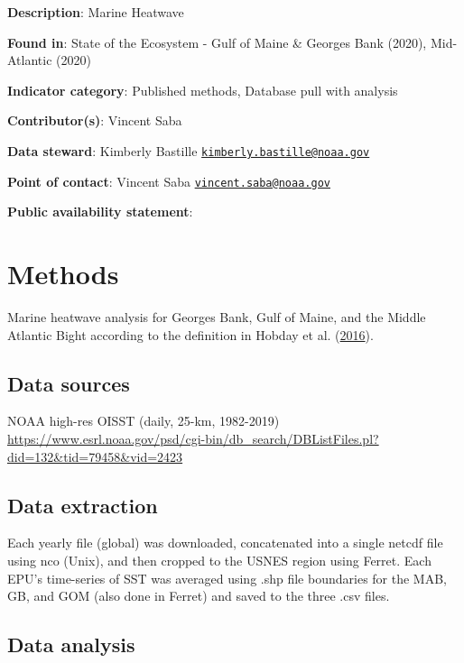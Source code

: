 \documentclass[
]{book}
\begin{document}
\textbf{Description}: Marine Heatwave

\textbf{Found in}: State of the Ecosystem - Gulf of Maine \& Georges Bank (2020), Mid-Atlantic (2020)

\textbf{Indicator category}: Published methods, Database pull with analysis

\textbf{Contributor(s)}: Vincent Saba

\textbf{Data steward}: Kimberly Bastille \href{mailto:kimberly.bastille@noaa.gov}{\nolinkurl{kimberly.bastille@noaa.gov}}

\textbf{Point of contact}: Vincent Saba \href{mailto:vincent.saba@noaa.gov}{\nolinkurl{vincent.saba@noaa.gov}}

\textbf{Public availability statement}:

\hypertarget{methods-25}{%
\section{Methods}\label{methods-25}}

Marine heatwave analysis for Georges Bank, Gulf of Maine, and the Middle Atlantic Bight according to the definition in Hobday et al. (\protect\hyperlink{ref-hobday2016}{2016}).

\hypertarget{data-sources-25}{%
\subsection{Data sources}\label{data-sources-25}}

NOAA high-res OISST (daily, 25-km, 1982-2019) \url{https://www.esrl.noaa.gov/psd/cgi-bin/db_search/DBListFiles.pl?did=132\&tid=79458\&vid=2423}

\hypertarget{data-extraction-22}{%
\subsection{Data extraction}\label{data-extraction-22}}

Each yearly file (global) was downloaded, concatenated into a single netcdf file using nco (Unix), and then cropped to the USNES region using Ferret. Each EPU's time-series of SST was averaged using .shp file boundaries for the MAB, GB, and GOM (also done in Ferret) and saved to the three .csv files.

\hypertarget{data-analysis-23}{%
\subsection{Data analysis}\label{data-analysis-23}}
\end{document}
